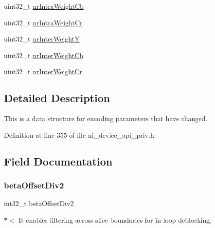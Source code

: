 \begin{DoxyCompactItemize}
\item 
uint32\+\_\+t \mbox{\hyperlink{struct__ni__encoder__change__params__t_aa8a865dc5d4a14ca3ca0dcd73f7b8613}{nr\+Intra\+Weight\+Cb}}
\item 
uint32\+\_\+t \mbox{\hyperlink{struct__ni__encoder__change__params__t_a2d292036b89b683d075e6b729abbc47f}{nr\+Intra\+Weight\+Cr}}
\item 
uint32\+\_\+t \mbox{\hyperlink{struct__ni__encoder__change__params__t_a572ab28c94c7239c17d6ff712f24b892}{nr\+Inter\+WeightY}}
\item 
uint32\+\_\+t \mbox{\hyperlink{struct__ni__encoder__change__params__t_a82fa586ef2b68c8095f8efac3de9980b}{nr\+Inter\+Weight\+Cb}}
\item 
uint32\+\_\+t \mbox{\hyperlink{struct__ni__encoder__change__params__t_a74f5c8aec093eefb24e8c81971f560ab}{nr\+Inter\+Weight\+Cr}}
\end{DoxyCompactItemize}


\subsection{Detailed Description}
This is a data structure for encoding parameters that have changed. 


\begin{DoxyItemize}
\item 
\end{DoxyItemize}

Definition at line 355 of file ni\+\_\+device\+\_\+api\+\_\+priv.\+h.



\subsection{Field Documentation}
\mbox{\label{struct__ni__encoder__change__params__t_a4025d29cf80610df5b8debd77941bba1}} 
\subsubsection{\texorpdfstring{betaOffsetDiv2}{betaOffsetDiv2}}
{\footnotesize\ttfamily int32\+\_\+t beta\+Offset\+Div2}

$\ast$$<$ It enables filtering across slice boundaries for in-\/loop deblocking. 

